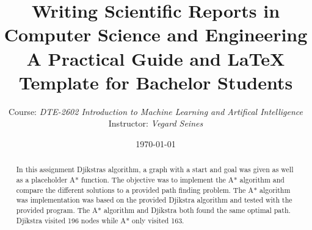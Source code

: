\documentclass[11pt,a4paper]{article}
\title{%
  \AddToHook{shipout/background}{%
  \ifnum\value{page}=1
    \uitTitleLogo
  \fi
}
  \Large
  \textcolor{uitDarkBlue}{%
    \textbf{Writing Scientific Reports in\\
    Computer Science and Engineering}%
  }
  \\[0.3em]
  \large
  A Practical Guide and \LaTeX{} Template for Bachelor Students
}
\author{
  Course: \emph{DTE-2602 Introduction to Machine Learning and Artifical Intelligence}\\
  Instructor: \emph{Vegard Seines}
}
\date{\today}
\begin{document}
\maketitle

\begin{abstract}
  In this assignment Djikstras algorithm, a graph with a start and goal was given as well as a placeholder A* function. The objective was to implement the A* algorithm and compare the different solutions to a provided path finding problem. The A* algorithm was implementation was based on the provided Djikstra algorithm and tested with the provided program. The A* algorithm and Djikstra both found the same optimal path. Djikstra visited 196 nodes while A* only visited 163.
\end{abstract}

\newpage
\tableofcontents
\thispagestyle{fancy}
\newpage


\newpage

\newpage

\newpage

\newpage

\newpage

\newpage



\end{document}
